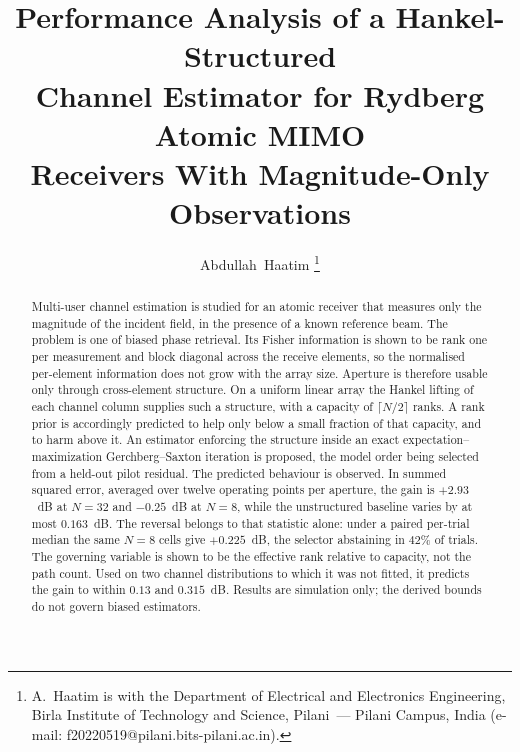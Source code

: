 \documentclass[journal]{IEEEtran}
\begin{document}
\title{Performance Analysis of a Hankel-Structured\\
Channel Estimator for Rydberg Atomic MIMO\\
Receivers With Magnitude-Only Observations}

\author{Abdullah~Haatim%
\thanks{A.~Haatim is with the Department of Electrical and Electronics
Engineering, Birla Institute of Technology and Science, Pilani~--- Pilani
Campus, India (e-mail: f20220519@pilani.bits-pilani.ac.in).}}

\maketitle

\begin{abstract}
Multi-user channel estimation is studied for an atomic receiver that measures
only the magnitude of the incident field, in the presence of a known reference
beam. The problem is one of biased phase retrieval. Its Fisher information is
shown to be rank one per measurement and block diagonal across the receive
elements, so the normalised per-element information does not grow with the
array size. Aperture is therefore usable only through cross-element structure.
On a uniform linear array the Hankel lifting of each channel column supplies
such a structure, with a capacity of $\lceil N/2\rceil$ ranks. A rank prior is
accordingly predicted to help only below a small fraction of that capacity, and
to harm above it. An estimator enforcing the structure inside an exact
expectation--maximization Gerchberg--Saxton iteration is proposed, the model
order being selected from a held-out pilot residual. The predicted behaviour is
observed. In summed squared error, averaged over twelve operating points per
aperture, the gain is $+2.93$~dB at $N=32$ and $-0.25$~dB at $N=8$, while the
unstructured baseline varies by at most $0.163$~dB. The reversal belongs to
that statistic alone: under a paired per-trial median the same $N=8$ cells give
$+0.225$~dB, the selector abstaining in $42\%$ of trials. The governing
variable is shown to be the effective rank relative to capacity, not the path
count. Used on two channel distributions to which it was not fitted, it
predicts the gain to within $0.13$ and $0.315$~dB. Results are simulation only;
the derived bounds do not govern biased estimators.
\end{abstract}
\end{document}
